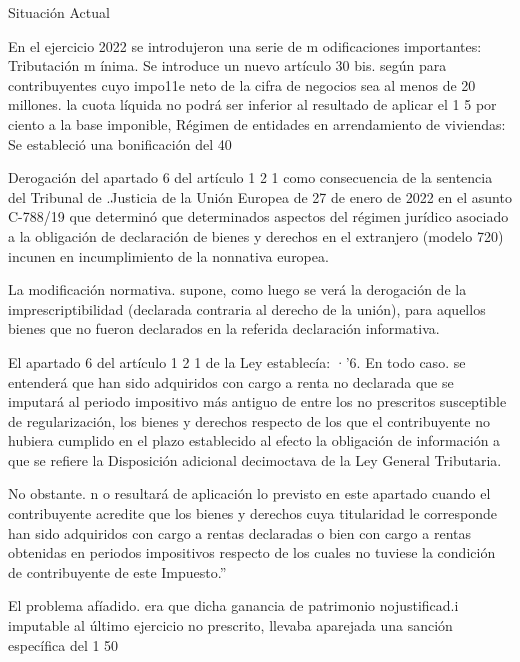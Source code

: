 \documentclass[10pt,a4paper]{article}
\begin{document}
Situación Actual

En el ejercicio 2022 se introdujeron una serie de m odificaciones importantes: Tributación m ínima. Se introduce un nuevo artículo 30 bis. según para contribuyentes cuyo impo11e neto de la cifra de negocios sea al menos de 20 millones. la cuota líquida no podrá ser inferior al resultado de aplicar el 1 5 por ciento a la base imponible, Régimen de entidades en arrendamiento de viviendas: Se estableció una bonificación del 40 %

Derogación del apartado 6 del artículo 1 2 1 como consecuencia de la sentencia del Tribunal de .Justicia de la Unión Europea de 27 de enero de 2022 en el asunto C-788/19 que determinó que determinados aspectos del régimen jurídico asociado a la obligación de declaración de bienes y derechos en el extranjero (modelo 720) incunen en incumplimiento de la nonnativa europea.

La modificación normativa. supone, como luego se verá la derogación de la imprescriptibilidad (declarada contraria al derecho de la unión), para aquellos bienes que no fueron declarados en la referida declaración informativa.

El apartado 6 del artículo 1 2 1 de la Ley establecía: ·'6. En todo caso. se entenderá que han sido adquiridos con cargo a renta no declarada que se imputará al periodo impositivo más antiguo de entre los no prescritos susceptible de regularización, los bienes y derechos respecto de los que el contribuyente no hubiera cumplido en el plazo establecido al efecto la obligación de información a que se refiere la Disposición adicional decimoctava de la Ley General Tributaria.

No obstante. n o resultará de aplicación lo previsto en este apartado cuando el contribuyente acredite que los bienes y derechos cuya titularidad le corresponde han sido adquiridos con cargo a rentas declaradas o bien con cargo a rentas obtenidas en periodos impositivos respecto de los cuales no tuviese la condición de contribuyente de este Impuesto.''

El problema afíadido. era que dicha ganancia de patrimonio nojustificad.i imputable al último ejercicio no prescrito, llevaba aparejada una sanción específica del 1 50%
\end{document}
